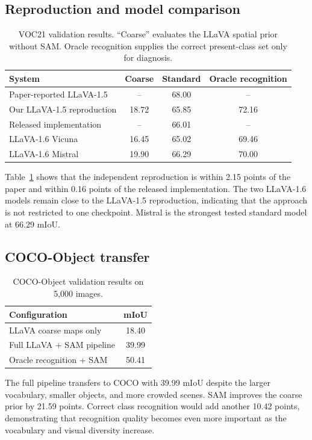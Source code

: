 \documentclass{article}
\newcommand{\miou}{mIoU}
\begin{document}
\subsection{Reproduction and model comparison}
\begin{table}[t]
\centering
\caption{VOC21 validation results. ``Coarse'' evaluates the LLaVA spatial prior without SAM.
Oracle recognition supplies the correct present-class set only for diagnosis.}
\label{tab:voc}
\begin{tabular}{lccc}
\toprule
System & Coarse & Standard & Oracle recognition\\
\midrule
Paper-reported LLaVA-1.5 & -- & 68.00 & --\\
Our LLaVA-1.5 reproduction & 18.72 & 65.85 & 72.16\\
Released implementation & -- & 66.01 & --\\
LLaVA-1.6 Vicuna & 16.45 & 65.02 & 69.46\\
LLaVA-1.6 Mistral & 19.90 & 66.29 & 70.00\\
\bottomrule
\end{tabular}
\end{table}

Table~\ref{tab:voc} shows that the independent reproduction is within 2.15 points of the paper
and within 0.16 points of the released implementation. The two LLaVA-1.6 models remain close to
the LLaVA-1.5 reproduction, indicating that the approach is not restricted to one checkpoint.
Mistral is the strongest tested standard model at 66.29 \miou{}.

\subsection{COCO-Object transfer}
\begin{table}[t]
\centering
\caption{COCO-Object validation results on 5,000 images.}
\label{tab:coco}
\begin{tabular}{lc}
\toprule
Configuration & \miou{}\\
\midrule
LLaVA coarse maps only & 18.40\\
Full LLaVA + SAM pipeline & 39.99\\
Oracle recognition + SAM & 50.41\\
\bottomrule
\end{tabular}
\end{table}

The full pipeline transfers to COCO with 39.99 \miou{} despite the larger vocabulary, smaller
objects, and more crowded scenes. SAM improves the coarse prior by 21.59 points. Correct class
recognition would add another 10.42 points, demonstrating that recognition quality becomes even
more important as the vocabulary and visual diversity increase.
\end{document}
